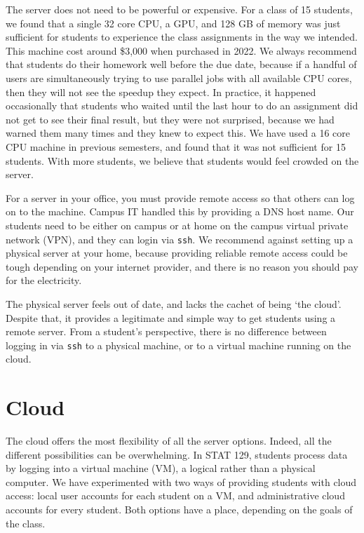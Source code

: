 \documentclass[12pt]{article}
\begin{document}
The server does not need to be powerful or expensive.
For a class of 15 students, we found that a single 32 core CPU, a GPU, and 128 GB of memory was just sufficient for students to experience the class assignments in the way we intended.
This machine cost around \$3,000 when purchased in 2022.
We always recommend that students do their homework well before the due date, because if a handful of users are simultaneously trying to use parallel jobs with all available CPU cores, then they will not see the speedup they expect.
In practice, it happened occasionally that students who waited until the last hour to do an assignment did not get to see their final result, but they were not surprised, because we had warned them many times and they knew to expect this.
We have used a 16 core CPU machine in previous semesters, and found that it was not sufficient for 15 students.
With more students, we believe that students would feel crowded on the server.

For a server in your office, you must provide remote access so that others can log on to the machine.
Campus IT handled this by providing a DNS host name.
Our students need to be either on campus or at home on the campus virtual private network (VPN), and they can login via \texttt{ssh}.
We recommend against setting up a physical server at your home, because providing reliable remote access could be tough depending on your internet provider, and there is no reason you should pay for the electricity.

The physical server feels out of date, and lacks the cachet of being `the cloud'.
Despite that, it provides a legitimate and simple way to get students using a remote server.
From a student's perspective, there is no difference between logging in via \texttt{ssh} to a physical machine, or to a virtual machine running on the cloud.

\section{Cloud}
\label{sec:cloud}

The cloud offers the most flexibility of all the server options.
Indeed, all the different possibilities can be overwhelming.
In STAT 129, students process data by logging into a virtual machine (VM), a logical rather than a physical computer.
We have experimented with two ways of providing students with cloud access: local user accounts for each student on a VM, and administrative cloud accounts for every student.
Both options have a place, depending on the goals of the class.
\end{document}
